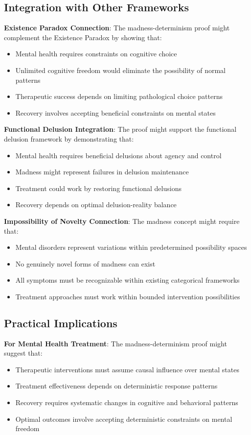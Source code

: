 \documentclass[12pt]{article}
\begin{document}
\subsection{Integration with Other Frameworks}

\textbf{Existence Paradox Connection}: The madness-determinism proof might complement the Existence Paradox by showing that:
\begin{itemize}
\item Mental health requires constraints on cognitive choice
\item Unlimited cognitive freedom would eliminate the possibility of normal patterns
\item Therapeutic success depends on limiting pathological choice patterns
\item Recovery involves accepting beneficial constraints on mental states
\end{itemize}

\textbf{Functional Delusion Integration}: The proof might support the functional delusion framework by demonstrating that:
\begin{itemize}
\item Mental health requires beneficial delusions about agency and control
\item Madness might represent failures in delusion maintenance
\item Treatment could work by restoring functional delusions
\item Recovery depends on optimal delusion-reality balance
\end{itemize}

\textbf{Impossibility of Novelty Connection}: The madness concept might require that:
\begin{itemize}
\item Mental disorders represent variations within predetermined possibility spaces
\item No genuinely novel forms of madness can exist
\item All symptoms must be recognizable within existing categorical frameworks
\item Treatment approaches must work within bounded intervention possibilities
\end{itemize}

\subsection{Practical Implications}

\textbf{For Mental Health Treatment}: The madness-determinism proof might suggest that:
\begin{itemize}
\item Therapeutic interventions must assume causal influence over mental states
\item Treatment effectiveness depends on deterministic response patterns
\item Recovery requires systematic changes in cognitive and behavioral patterns
\item Optimal outcomes involve accepting deterministic constraints on mental freedom
\end{itemize}
\end{document}
